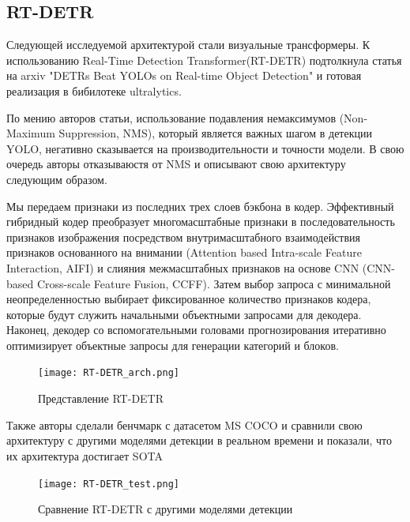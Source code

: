 \documentclass[../document.tex]{subfiles}
\begin{document}
	\subsection{RT-DETR}
		\par Следующей исследуемой архитектурой стали визуальные трансформеры. К использованию Real-Time Detection Transformer(RT-DETR) подтолкнула статья на arxiv "DETRs Beat YOLOs on Real-time Object Detection" и готовая реализация в бибилотеке ultralytics.
		\par По мению авторов статьи, использование подавления немаксимумов (Non-Maximum Suppression, NMS), который является важных шагом в детекции YOLO, негативно сказывается на производительности и точности модели. В свою очередь авторы отказываюстя от NMS и описывают свою архитектуру следующим образом.
		\par Мы передаем признаки из последних трех слоев бэкбона в кодер. Эффективный гибридный кодер преобразует многомасштабные признаки в последовательность признаков изображения посредством внутримасштабного взаимодействия признаков основанного на внимании (Attention based Intra-scale Feature Interaction, AIFI) и слияния межмасштабных признаков на основе CNN (CNN-based Cross-scale Feature Fusion, CCFF). Затем выбор запроса с минимальной неопределенностью выбирает фиксированное количество признаков кодера, которые будут служить начальными объектными запросами для декодера. Наконец, декодер со вспомогательными головами прогнозирования итеративно оптимизирует объектные запросы для генерации категорий и блоков.
		\begin{figure}[H]
			\centering
			\texttt{[image: RT-DETR\_arch.png]}
			\caption{Представление RT-DETR}
		\end{figure}
		
		\par Также авторы сделали бенчмарк с датасетом MS COCO и сравнили свою архитектуру с другими моделями детекции в реальном времени и показали, что их архитектура достигает SOTA
		\begin{figure}[H]
			\centering
			\texttt{[image: RT-DETR\_test.png]}
			\caption{Сравнение RT-DETR с другими моделями детекции}
		\end{figure}
	
\end{document}
